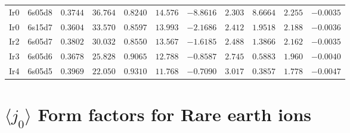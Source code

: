 \begin{table}[H]
{\begin{tabular}{llrrrrrrrrr}
Ir0 & 6s05d8 &$0.3744$ &$36.764$ &$0.8240$ &$14.576$ &$-8.8616$ &$2.303$ &$8.6664$ &$2.255$ &$-0.0035$ \\
Ir0 & 6s15d7 &$0.3604$ &$33.570$ &$0.8597$ &$13.993$ &$-2.1686$ &$2.412$ &$1.9518$ &$2.188$ &$-0.0036$ \\
Ir2 & 6s05d7 &$0.3802$ &$30.032$ &$0.8550$ &$13.567$ &$-1.6185$ &$2.488$ &$1.3866$ &$2.162$ &$-0.0035$ \\
Ir3 & 6s05d6 &$0.3678$ &$25.828$ &$0.9065$ &$12.788$ &$-0.8587$ &$2.745$ &$0.5883$ &$1.960$ &$-0.0040$ \\
Ir4 & 6s05d5 &$0.3969$ &$22.050$ &$0.9310$ &$11.768$ &$-0.7090$ &$3.017$ &$0.3857$ &$1.778$ &$-0.0047$ \\
\hline
\end{tabular}
}
\end{table}
\section{{\large$\langle j_0\rangle$ }Form factors for Rare earth ions}

